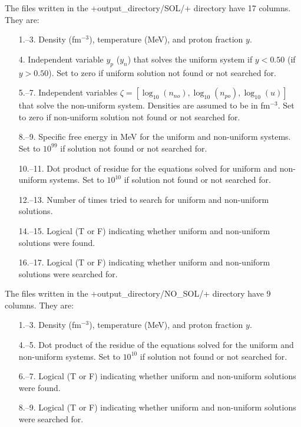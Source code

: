 \documentclass[letterpaper,11pt]{refart}
\begin{document}
The files written in the \verbfile+output_directory/SOL/+ directory have
17 columns.  They are:

\begin{enumerate}
 \item[1.--3.] Density (fm$^{-3}$), temperature (MeV), and proton
   fraction $y$.

 \item[4.] Independent variable $y_p$ ($y_n$) that solves the uniform
   system if $y<0.50$ (if $y>0.50$). Set to zero if uniform solution
   not found or not searched for.

 \item[5.--7.] Independent variables $\zeta=[\log_{10}(n_{no}),
   \log_{10}(n_{po}), \log_{10}(u)]$ that solve the non-uniform
   system. Densities are assumed to be in fm$^{-3}$. Set to zero if
   non-uniform solution not found or not searched for.

 \item[8.--9.] Specific free energy in MeV
   for the uniform and non-uniform systems. Set to
   $10^{99}$ if solution not found or not searched for.

 \item[10.--11.] Dot product of residue for the equations solved for
   uniform and non-uniform systems. Set to $10^{10}$ if solution not
   found or not searched for.

 \item[12.--13.] Number of times tried to search for uniform and
   non-uniform solutions.

 \item[14.--15.] Logical (T or F) indicating whether uniform and
   non-uniform solutions were found.

 \item[16.--17.] Logical (T or F) indicating whether uniform and
   non-uniform solutions were searched for.

\end{enumerate}




The files written in the \verbfile+output_directory/NO_SOL/+ directory
have 9 columns.  They are:

\begin{enumerate}

\item[1.--3.] Density (fm$^{-3}$), temperature (MeV), and proton
  fraction $y$.

\item[4.--5.] Dot product of the residue of the equations solved for
  the uniform and non-uniform systems. Set to $10^{10}$ if solution
  not found or not searched for.

\item[6.--7.] Logical (T or F) indicating whether uniform and
  non-uniform solutions were found.

\item[8.--9.] Logical (T or F) indicating whether uniform and
  non-uniform solutions were searched for.

\end{enumerate}
\end{document}
